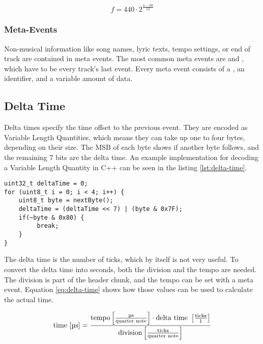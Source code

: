\begin{equation}\label{eq:note-number}
    f = 440 \cdot 2^{\frac{n - 69}{12}}
\end{equation}

\subsubsection{Meta-Events}

Non-musical information like song names, lyric texts, tempo settings, or end of track are contained in meta events. The most common meta events are  and , which have to be every track's last event. Every meta event consists of a , an identifier, and a variable amount of data.

\subsection{Delta Time}

Delta times specify the time offset to the previous event. They are encoded as Variable Length Quantities, which means they can take up one to four bytes, depending on their size. The MSB %
of each byte shows if another byte follows, and the remaining 7 bits are the delta time. An example implementation for decoding a Variable Length Quantity in C++ can be seen in the listing \ref{lst:delta-time}.

\begin{lstlisting}[caption=Decoding the Delta Time, label=lst:delta-time]
uint32_t deltaTime = 0;
for (uint8_t i = 0; i < 4; i++) {
    uint8_t byte = nextByte();
    deltaTime = (deltaTime << 7) | (byte & 0x7F);
    if(~byte & 0x80) {
         break;
    }
}
\end{lstlisting}

The delta time is the number of ticks, which by itself is not very useful. To convert the delta time into seconds, both the division and the tempo are needed. The division is part of the header chunk, and the tempo can be set with a meta event. Equation \ref{eq:delta-time} shows how those values can be used to calculate the actual time.

\begin{equation}\label{eq:delta-time}
    \textnormal{time [\textmu s]} = \frac{{\textnormal{tempo} \left[ \frac{\textnormal{\textmu s}}{\textnormal{quarter note}} \right] \cdot \textnormal{delta time } \left[\frac{\textnormal{ticks}}{1}\right]}}{\textnormal{division}  \left[ \frac{\textnormal{ticks}}{\textnormal{quarter note}} \right]}
\end{equation}


